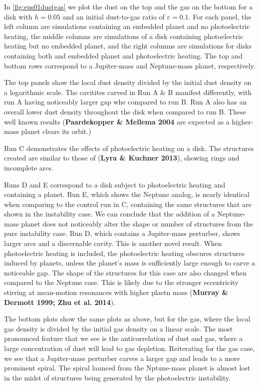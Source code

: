 \documentclass[onecolumn]{report}
\newcommand{\epsi}{\varepsilon}
\begin{document}
In \ref{fig:eps01dustgas} we plot the dust on the top and the gas on the bottom for a disk with $h=0.05$ and an initial dust-to-gas ratio of $\epsi=0.1$. For each panel, the left column are simulations containing an embedded planet and no photoelectric heating, the middle columns are simulations of a disk containing photoelectric heating but no embedded planet, and the right columns are simulations for disks containing both and embedded planet and photoelectric heating. The top and bottom rows correspond to a Jupiter-mass and Neptune-mass planet, respectively.

The top panels show the local dust density divided by the initial dust density on a logarithmic scale. The cavitites carved in Run A \& B manifest differently, with run A having noticeably larger gap whe compared to run B. Run A also has an overall lower dust density throughout the disk when compared to run B. These well known results (\textbf{Paardekopper \& Mellema 2004} are expected as a higher-mass planet clears its orbit.)

Run C demonstrates the effects of photoelectric heating on a disk. The structures created are similar to those of (\textbf{Lyra \& Kuchner 2013}), showing rings and incomplete arcs.

Runs D and E correspond to a disk subject to photoelectric heating and containing a planet. Run E, which shows the Neptune analog, is nearly identical when comparing to the control run in C, containing the same structures that are shown in the instability case. We can conclude that the addition of a Neptune-mass planet does not noticeably alter the shape or number of structures from the pure instability case. Run D, which contains a Jupiter-mass perturber, shows larger arcs and a discernable cavity. This is another novel result. When photoelectric heating is included, the photoelectric heating obscures structures induced by planets, unless the planet's mass is sufficiently large enough to carve a noticeable gap. The shape of the structures for this case are also changed when compared to the Neptune case. This is likely due to the stronger eccentricity stirring at mean-motion resonances with higher plaetn mass (\textbf{Murray \& Dermott 1999; Zhu et al. 2014}).

The bottom plots show the same plots as above, but for the gas, where the local gas density is divided by the initial gas density on a linear scale. The most pronounced feature that we see is the anticorrelation of dust and gas, where a large concentration of dust will lead to gas depletion. Reiterating for the gas case, we see that a Jupiter-mass perturber carves a larger gap and leads to a more prominent spiral. The spiral launced from the Nptune-mass planet is almost lost in the midst of structures being generated by the photoelectric instability.
\end{document}
